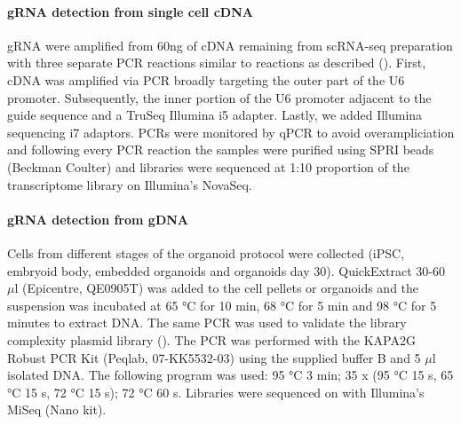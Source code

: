 \paragraph{gRNA detection from single cell cDNA}
gRNA were amplified from 60ng of cDNA remaining from scRNA-seq preparation with three separate PCR reactions similar to reactions as described (\cite{hill_design_2018}). First, cDNA was amplified via PCR broadly targeting the outer part of the U6 promoter. Subsequently, the inner portion of the U6 promoter adjacent to the guide sequence and a TruSeq Illumina i5 adapter. Lastly, we added Illumina sequencing i7 adaptors. PCRs were monitored by qPCR to avoid overampliciation and following every PCR reaction the samples were purified using SPRI beads (Beckman Coulter) and libraries were sequenced at 1:10 proportion of the transcriptome library on Illumina's NovaSeq.
 
\paragraph{gRNA detection from gDNA}
Cells from different stages of the organoid protocol were collected (iPSC, embryoid body, embedded organoids and organoids day 30). QuickExtract 30-60 $\mu$l (Epicentre, QE0905T) was added to the cell pellets or organoids and the suspension was incubated at 65 °C for 10 min, 68 °C for 5 min and 98 °C for 5 minutes to extract DNA. The same PCR was used to validate the library complexity plasmid library (\cite{datlinger_pooled_2017}). The PCR was performed with the KAPA2G Robust PCR Kit (Peqlab, 07-KK5532-03) using the supplied buffer B and  5 $\mu$l isolated DNA. The following program was used: 95 °C 3 min; 35 x (95 °C 15 s, 65 °C 15 s, 72  °C 15 s); 72 °C 60 s. Libraries were sequenced on with Illumina's MiSeq (Nano kit).
 
